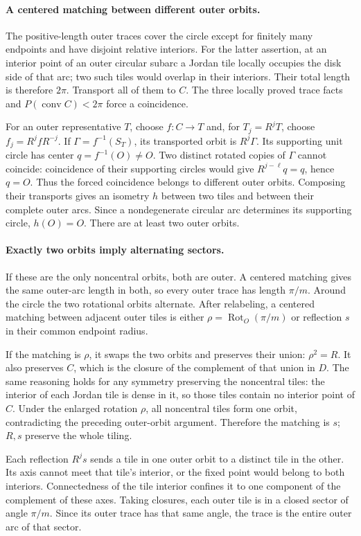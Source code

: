 \documentclass[11pt]{article}
\newcommand{\conv}{\operatorname{conv}}
\newcommand{\Rot}{\operatorname{Rot}}
\begin{document}
\paragraph{A centered matching between different outer orbits.}
The positive-length outer traces cover the circle except for finitely many
endpoints and have disjoint relative interiors. For the latter assertion,
at an interior point of an outer circular subarc a Jordan tile locally occupies
the disk side of that arc; two such tiles would overlap in their interiors.
Their total length is therefore $2\pi$. Transport all of them to $C$.
The three locally proved trace facts and $P(\conv C)<2\pi$ force a coincidence.

For an outer representative $T$, choose $f:C\to T$ and, for $T_j=R^jT$,
choose $f_j=R^jfR^{-j}$. If $\Gamma=f^{-1}(S_T)$, its transported orbit
is $R^j\Gamma$. Its supporting unit circle has center $q=f^{-1}(O)\ne O$.
Two distinct rotated copies of $\Gamma$ cannot coincide: coincidence of their
supporting circles would give $R^{j-\ell}q=q$, hence $q=O$. Thus the forced
coincidence belongs to different outer orbits. Composing their transports
gives an isometry $h$ between two tiles and between their complete outer
arcs. Since a nondegenerate circular arc determines its supporting circle,
$h(O)=O$. There are at least two outer orbits.

\paragraph{Exactly two orbits imply alternating sectors.}
If these are the only noncentral orbits, both are outer. A centered matching
gives the same outer-arc length in both, so every outer trace has length
$\pi/m$. Around the circle the two rotational orbits alternate.
After relabeling, a centered matching between adjacent outer tiles is either
$\rho=\Rot_O(\pi/m)$ or reflection $s$ in their common endpoint radius.

If the matching is $\rho$, it swaps the two orbits and preserves their union:
$\rho^2=R$. It also preserves $C$, which is the closure of the complement of
that union in $D$. The same reasoning holds for any symmetry preserving the
noncentral tiles: the interior of each Jordan tile is dense in it, so those
tiles contain no interior point of $C$. Under the enlarged rotation $\rho$,
all noncentral tiles form one orbit, contradicting the preceding outer-orbit
argument. Therefore the matching is $s$; $R,s$ preserve the whole tiling.

Each reflection $R^js$ sends a tile in one outer orbit to a distinct tile
in the other. Its axis cannot meet that tile's interior, or the fixed point
would belong to both interiors. Connectedness of the tile interior confines
it to one component of the complement of these axes. Taking closures,
each outer tile is in a closed sector of angle $\pi/m$. Since its outer
trace has that same angle, the trace is the entire outer arc of that sector.
\end{document}

